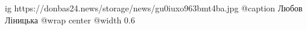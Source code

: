  
 
 
 
 

\ifcmt
  ig https://donbas24.news/storage/news/gu0iuxo963bmt4ba.jpg
	@caption Любов Ліницька
  @wrap center
  @width 0.6
\fi
